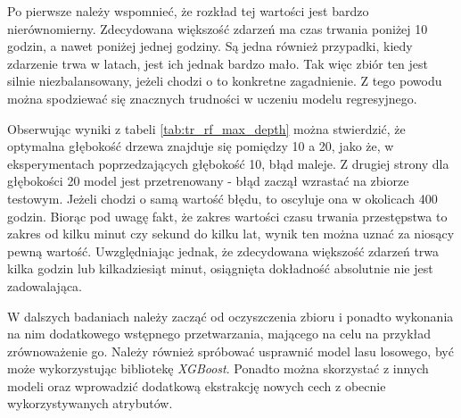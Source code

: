 \documentclass{classrep}
\begin{document}
{{{                Po pierwsze należy wspomnieć, że rozkład tej wartości jest bardzo nierównomierny. Zdecydowana
                większość zdarzeń ma czas trwania poniżej 10 godzin, a nawet poniżej jednej godziny. Są jedna również
                przypadki, kiedy zdarzenie trwa w latach, jest ich jednak bardzo mało. Tak więc zbiór ten jest silnie
                niezbalansowany, jeżeli chodzi o to konkretne zagadnienie. Z tego powodu można spodziewać się
                znacznych trudności w uczeniu modelu regresyjnego.

                Obserwując wyniki z tabeli \ref{tab:tr_rf_max_depth} można stwierdzić, że optymalna głębokość drzewa
                znajduje się pomiędzy 10 a 20, jako że, w eksperymentach poprzedzających głębokość 10, błąd maleje. Z
                drugiej strony dla głębokości 20 model jest przetrenowany - błąd zaczął wzrastać na zbiorze testowym.
                Jeżeli chodzi o samą wartość błędu, to oscyluje ona w okolicach 400 godzin. Biorąc pod uwagę fakt, że
                zakres wartości czasu trwania przestępstwa to zakres od kilku minut czy sekund do kilku lat, wynik
                ten można uznać za niosący pewną wartość. Uwzględniając jednak, że zdecydowana większość zdarzeń trwa
                kilka godzin lub kilkadziesiąt minut, osiągnięta dokładność absolutnie nie jest zadowalająca.

                W dalszych badaniach należy zacząć od oczyszczenia zbioru i ponadto wykonania na nim dodatkowego
                wstępnego przetwarzania, mającego na celu na przykład zrównoważenie go. Należy również spróbować
                usprawnić model lasu losowego, być może wykorzystując bibliotekę \emph{XGBoost}. Ponadto można
                skorzystać z innych modeli oraz wprowadzić dodatkową ekstrakcję nowych cech z obecnie
                wykorzystywanych atrybutów.
            }

        }

}
\end{document}

